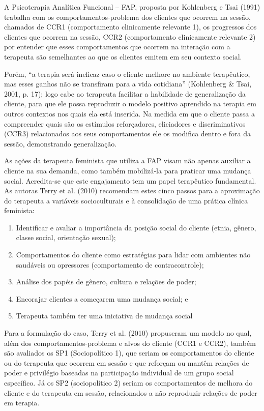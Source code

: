A Psicoterapia Analítica Funcional – FAP, proposta por Kohlenberg e Tsai (1991) trabalha com os comportamentos-problema dos clientes que ocorrem na sessão, chamados de CCR1 (comportamento clinicamente relevante 1), os progressos dos clientes que ocorrem na sessão, CCR2 (comportamento clinicamente relevante 2) por entender que esses comportamentos que ocorrem na interação com a terapeuta são semelhantes ao que os clientes emitem em seu contexto social.

Porém, “a terapia será ineficaz caso o cliente melhore no ambiente terapêutico, mas esses ganhos não se transfiram para a vida cotidiana” (Kohlenberg \& Tsai, 2001, p. 17); logo cabe ao terapeuta facilitar a habilidade de generalização da cliente, para que ele possa reproduzir o modelo positivo aprendido na terapia em outros contextos nos quais ela está inserida. Na medida em que o cliente passa a compreender quais são os estímulos reforçadores, eliciadores e discriminativos (CCR3) relacionados aos seus comportamentos ele os modifica dentro e fora da sessão, demonstrando generalização.

As ações da terapeuta feminista que utiliza a FAP visam não apenas auxiliar a cliente na sua demanda, como também mobilizá-la para praticar uma mudança social. Acredita-se que este engajamento tem um papel terapêutico fundamental. As autoras Terry et al. (2010) recomendam estes cinco passos para a aproximação do terapeuta a variáveis socioculturais e à consolidação de uma prática clínica feminista: 

\begin{enumerate}
    \item Identificar e avaliar a importância da posição social do cliente (etnia, gênero, classe social, orientação sexual);
    \item Comportamentos do cliente como estratégias para lidar com ambientes não saudáveis ou opressores (comportamento de contracontrole);
    \item Análise dos papéis de gênero, cultura e relações de poder;
    \item Encorajar clientes a começarem uma mudança social; e
    \item Terapeuta também ter uma iniciativa de mudança social
\end{enumerate}

Para a formulação do caso, Terry et al. (2010) propuseram um modelo no qual, além dos comportamentos-problema e alvos do cliente (CCR1 e CCR2), também são avaliados os SP1 (Sociopolítico 1), que seriam os comportamentos do cliente ou do terapeuta que ocorrem em sessão e que reforçam ou mantêm relações de poder e privilégio baseadas na participação individual de um grupo social específico. Já os SP2 (sociopolítico 2) seriam os comportamentos de melhora do cliente e do terapeuta em sessão, relacionados a não reproduzir relações de poder em terapia.

